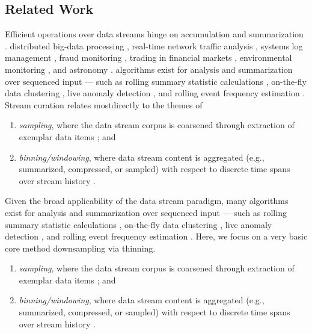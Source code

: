 \subsection{Related Work}

Efficient operations over data streams hinge on accumulation and summarization .
distributed big-data processing \citep{he2010comet}, real-time network traffic analysis \citep{johnson2005streams,muthukrishnan2005data}, systems log management \citep{fischer2012real}, fraud monitoring \citep{rajeshwari2016real}, trading in financial markets \citep{agarwal2009faster}, environmental monitoring \citep{hill2009real}, and astronomy \citep{graham2012data}.
algorithms exist for analysis and summarization over sequenced input --- such as rolling summary statistic calculations \citep{lin2004continuously}, on-the-fly data clustering \citep{silva2013data}, live anomaly detection \citep{cai2004maids}, and rolling event frequency estimation \citep{manku2002approximate}.
Stream curation relates mostdirectly to the themes of
\begin{enumerate}
\item \textit{sampling}, where the data stream corpus is coarsened through extraction of exemplar data items \citep{sibai2016sampling}; and
\item \textit{binning/windowing}, where data stream content is aggregated (e.g., summarized, compressed, or sampled) with respect to discrete time spans over stream history \citep{gama2007data}.
\end{enumerate}

Given the broad applicability of the data stream paradigm, many algorithms exist for analysis and summarization over sequenced input --- such as rolling summary statistic calculations \citep{lin2004continuously}, on-the-fly data clustering \citep{silva2013data}, live anomaly detection \citep{cai2004maids}, and rolling event frequency estimation \citep{manku2002approximate}.
Here, we focus on a very basic core method downsampling via thinning.
\begin{enumerate}
\item \textit{sampling}, where the data stream corpus is coarsened through extraction of exemplar data items \citep{sibai2016sampling}; and
\item \textit{binning/windowing}, where data stream content is aggregated (e.g., summarized, compressed, or sampled) with respect to discrete time spans over stream history \citep{gama2007data}.
\end{enumerate}

